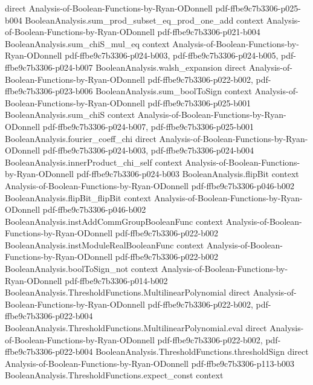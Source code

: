 \begin{lemma}
  {direct}
  {Analysis-of-Boolean-Functions-by-Ryan-ODonnell}
  {pdf-ffbe9c7b3306-p025-b004}
\proofstep
  {BooleanAnalysis.sum_prod_subset_eq_prod_one_add}
  {context}
  {Analysis-of-Boolean-Functions-by-Ryan-ODonnell}
  {pdf-ffbe9c7b3306-p021-b004}
\proofstep
  {BooleanAnalysis.sum_chiS_mul_eq}
  {context}
  {Analysis-of-Boolean-Functions-by-Ryan-ODonnell}
  {pdf-ffbe9c7b3306-p024-b003,
    pdf-ffbe9c7b3306-p024-b005,
    pdf-ffbe9c7b3306-p024-b007}
\proofstep
  {BooleanAnalysis.walsh_expansion}
  {direct}
  {Analysis-of-Boolean-Functions-by-Ryan-ODonnell}
  {pdf-ffbe9c7b3306-p022-b002,
    pdf-ffbe9c7b3306-p023-b006}
\proofstep
  {BooleanAnalysis.sum_boolToSign}
  {context}
  {Analysis-of-Boolean-Functions-by-Ryan-ODonnell}
  {pdf-ffbe9c7b3306-p025-b001}
\proofstep
  {BooleanAnalysis.sum_chiS}
  {context}
  {Analysis-of-Boolean-Functions-by-Ryan-ODonnell}
  {pdf-ffbe9c7b3306-p024-b007,
    pdf-ffbe9c7b3306-p025-b001}
\proofstep
  {BooleanAnalysis.fourier_coeff_chi}
  {direct}
  {Analysis-of-Boolean-Functions-by-Ryan-ODonnell}
  {pdf-ffbe9c7b3306-p024-b003,
    pdf-ffbe9c7b3306-p024-b004}
\proofstep
  {BooleanAnalysis.innerProduct_chi_self}
  {context}
  {Analysis-of-Boolean-Functions-by-Ryan-ODonnell}
  {pdf-ffbe9c7b3306-p024-b003}
\proofstep
  {BooleanAnalysis.flipBit}
  {context}
  {Analysis-of-Boolean-Functions-by-Ryan-ODonnell}
  {pdf-ffbe9c7b3306-p046-b002}
\proofstep
  {BooleanAnalysis.flipBit_flipBit}
  {context}
  {Analysis-of-Boolean-Functions-by-Ryan-ODonnell}
  {pdf-ffbe9c7b3306-p046-b002}
\proofstep
  {BooleanAnalysis.instAddCommGroupBooleanFunc}
  {context}
  {Analysis-of-Boolean-Functions-by-Ryan-ODonnell}
  {pdf-ffbe9c7b3306-p022-b002}
\proofstep
  {BooleanAnalysis.instModuleRealBooleanFunc}
  {context}
  {Analysis-of-Boolean-Functions-by-Ryan-ODonnell}
  {pdf-ffbe9c7b3306-p022-b002}
\proofstep
  {BooleanAnalysis.boolToSign_not}
  {context}
  {Analysis-of-Boolean-Functions-by-Ryan-ODonnell}
  {pdf-ffbe9c7b3306-p014-b002}
\proofstep
  {BooleanAnalysis.ThresholdFunctions.MultilinearPolynomial}
  {direct}
  {Analysis-of-Boolean-Functions-by-Ryan-ODonnell}
  {pdf-ffbe9c7b3306-p022-b002,
    pdf-ffbe9c7b3306-p022-b004}
\proofstep
  {BooleanAnalysis.ThresholdFunctions.MultilinearPolynomial.eval}
  {direct}
  {Analysis-of-Boolean-Functions-by-Ryan-ODonnell}
  {pdf-ffbe9c7b3306-p022-b002,
    pdf-ffbe9c7b3306-p022-b004}
\proofstep
  {BooleanAnalysis.ThresholdFunctions.thresholdSign}
  {direct}
  {Analysis-of-Boolean-Functions-by-Ryan-ODonnell}
  {pdf-ffbe9c7b3306-p113-b003}
\proofstep
  {BooleanAnalysis.ThresholdFunctions.expect_const}
  {context}

\end{lemma}

